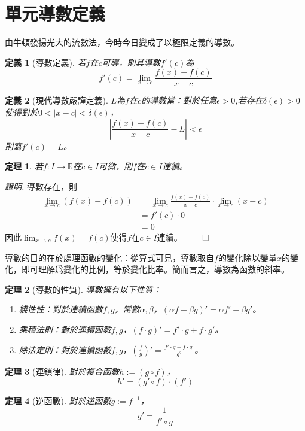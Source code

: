 \documentclass[12pt]{article}
\newtheorem{definition}{定義}
\newtheorem*{theorem}{定理}
\renewenvironment*{proof}{\textit{證明.}}{\hfill$\qed$}
\begin{document}
    \section*{單元導數定義}

    由牛頓發揚光大的流數法，今時今日變成了以極限定義的導數。

    \begin{definition}[導數定義]
        若$f$在$c$可導，則其導數$f'(c)$為$$f'(c)=\lim_{x\to c}\frac{f(x)-f(c)}{x-c}$$
    \end{definition}

    \begin{definition}[現代導數嚴謹定義]
        $L$為$f$在$c$的導數當：對於任意$\epsilon>0$,若存在$\delta(\epsilon)>0$使得對於$0<|x-c|<\delta(\epsilon)$，$$|\frac{f(x)-f(c)}{x-c}-L|<\epsilon$$
        則寫$f'(c)=L$。
    \end{definition}

    \begin{theorem}
        若$f:I\to\mathbb{R}$在$c\in I$可微，則$f$在$c\in I$連續。
    \end{theorem}

    \begin{proof}
        導數存在，則\begin{align*}
            \lim_{x\to c}(f(x)-f(c))&=\lim_{x\to c}\frac{f(x)-f(c)}{x-c}\cdot \lim_{x\to c}(x-c)\\
            &=f'(c)\cdot 0\\
            &=0
        \end{align*}
        因此$\displaystyle\lim_{x\to c}f(x)=f(c)$使得$f$在$c\in I$連續。
    \end{proof}

    導數的目的在於處理函數的變化：從算式可見，導數取自$f$的變化除以變量$x$的變化，即可理解爲變化的比例，等於變化比率。簡而言之，導數為函數的斜率。

    \begin{theorem}[導數的性質]
        導數擁有以下性質：\begin{enumerate}
            \item 綫性性：對於連續函數$f,g$，常數$\alpha,\beta$，$(\alpha f+\beta g)'=\alpha f' + \beta g'$。
            \item 乘積法則：對於連續函數$f,g$，$(f\cdot g)'=f'\cdot g + f\cdot g'$。
            \item 除法定則：對於連續函數$f,g$，$(\frac{f}{g})'=\frac{f'\cdot g-f\cdot g'}{g^2}$。
        \end{enumerate}
    \end{theorem}

    \begin{theorem}[連鎖律]
        對於複合函數$h:=(g\circ f)$，$$h'=(g'\circ f)\cdot(f')$$
    \end{theorem}

    \begin{theorem}[逆函數]
        對於逆函數$g:=f^{-1}$，$$g'=\frac{1}{f'\circ g}$$
    \end{theorem}
\end{document}
